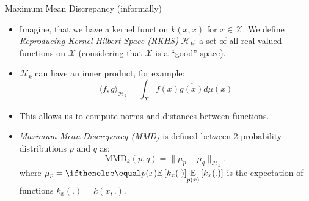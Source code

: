 \documentclass[handout, 10pt]{beamer}
\begin{document}
%
%    


\begin{frame}{Maximum Mean Discrepancy (informally)}
\begin{itemize}
    \item \pause Imagine, that we have a kernel function $k(x, x)$ for $x \in \mathcal{X}$. We define \textit{Reproducing Kernel Hilbert Space (RKHS)} $\mathcal{H}_k$: a set of all real-valued functions on $\mathcal{X}$ (considering that $\mathcal{X}$ is a ``good'' space).
    \item\pause $\mathcal{H}_k$ can have an inner product, for example:
\begin{equation*}
    \langle f, g\rangle_{\mathcal{H}_k} = \int_X f(x) \overline{g(x)} d\mu(x)
\end{equation*}

\item\pause This allows us to compute norms and distances between functions.

\item \pause \textit{Maximum Mean Discrepancy (MMD)} is defined between 2 probability distributions $p$ and $q$ as:
\begin{equation*}
\text{MMD}_k(p, q) = \| \mu_p - \mu_q \|_{\mathcal{H}_k},
\end{equation*}
where $\mu_p = \expect[p(x)]{k_x(.)}$ is the expectation of functions $k_x(.) = k(x, .)$.
\end{itemize}
\end{frame}
\end{document}
